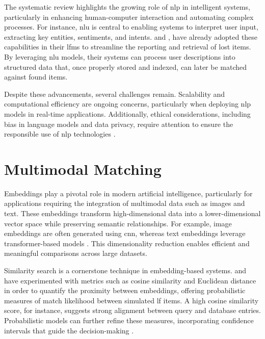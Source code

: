 The systematic review highlights the growing role of \ac{nlp} in intelligent systems, particularly in enhancing human-computer interaction and automating complex processes. For instance, \ac{nlu} is central to enabling systems to interpret user input, extracting key entities, sentiments, and intents.  and , have already adopted these capabilities in their \ac{lfms} to streamline the reporting and retrieval of lost items. By leveraging \ac{nlu} models, their systems can process user descriptions into structured data that, once properly stored and indexed, can later be matched against found items.

Despite these advancements, several challenges remain. Scalability and computational efficiency are ongoing concerns, particularly when deploying \ac{nlp} models in real-time applications. Additionally, ethical considerations, including bias in language models and data privacy, require attention to ensure the responsible use of \ac{nlp} technologies \cite{Prawira2024}.


\section{Multimodal Matching} \label{subsec:multimodal-matching}

Embeddings play a pivotal role in modern artificial intelligence, particularly for applications requiring the integration of multimodal data such as images and text. These embeddings transform high-dimensional data into a lower-dimensional vector space while preserving semantic relationships. For example, image embeddings are often generated using \ac{cnn}, whereas text embeddings leverage transformer-based models \cite{He2015, Devlin2019}. This dimensionality reduction enables efficient and meaningful comparisons across large datasets.

Similarity search is a cornerstone technique in embedding-based systems.  and  have experimented with metrics such as cosine similarity and Euclidean distance in order to quantify the proximity between embeddings, offering probabilistic measures of match likelihood between simulated \ac{lf} items. A high cosine similarity score, for instance, suggests strong alignment between query and database entries. Probabilistic models can further refine these measures, incorporating confidence intervals that guide the decision-making \cite{Dosovitskiy2020}.

